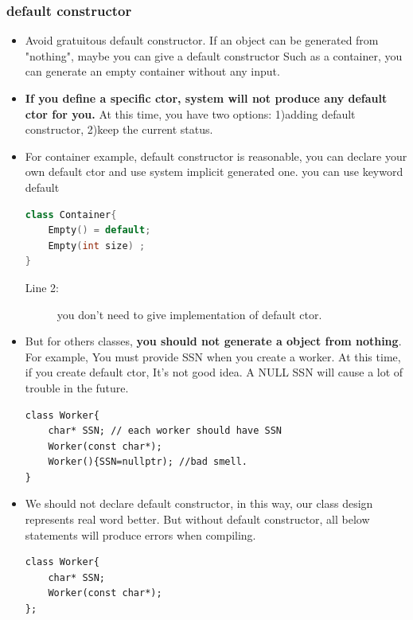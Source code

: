 \documentclass[a4paper,11pt,twoside]{book}
\begin{document}
\subsubsection{default constructor}
\begin{itemize}
	
	\item Avoid gratuitous default constructor. If an object can be generated from "nothing", maybe you can give a default constructor Such as a container, you can generate an empty container without any input. 
	
	\item \textbf{If you define a specific ctor, system will not produce any default ctor for you.} At this time, you have two options: 1)adding default constructor, 2)keep the current status.
	
	\item For container example, default constructor is reasonable, you can declare your own default ctor and use system implicit generated one. you can use keyword default
\begin{lstlisting}[frame=single, language=c++]
class Container{
	Empty() = default;
	Empty(int size) ;
}
\end{lstlisting}

	\begin{description}
		\item[Line 2:] you don't need to give implementation of default ctor.
	\end{description}
	
	
	\item But for others classes, \textbf{you should not generate a object from nothing}. For example, You must provide SSN when you create a worker. At this time, if you create default ctor, It's not good idea. A NULL SSN will cause a lot of trouble in the future. 
\begin{lstlisting}[numbers=none]
class Worker{
	char* SSN; // each worker should have SSN
	Worker(const char*);
	Worker(){SSN=nullptr); //bad smell.
}
\end{lstlisting}
	
	\item We should not declare default constructor, in this way, our class design represents real word better. But without default constructor, all below statements will produce errors when compiling.
	
\begin{lstlisting}
class Worker{
	char* SSN;
	Worker(const char*); 
};


\end{lstlisting}
\end{itemize}
\end{document}
